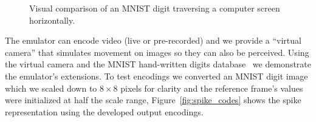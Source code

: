 \documentclass[conference]{IEEEtran}
\begin{document}
\begin{figure}[htb]
  \caption{Visual comparison of an MNIST digit traversing a computer screen horizontally.}
  \label{fig:dvs_vs_cam}
  
\end{figure}

The emulator can encode video (live or pre-recorded) and we provide a ``virtual camera'' that simulates movement on images so they can also be perceived. Using the virtual camera and the MNIST hand-written digits database~\cite{mnist,mnist:web} we demonstrate the emulator's extensions. To test encodings we converted an MNIST  digit image which we scaled down to $8\times8$ pixels for clarity and the reference frame's values were initialized at half the scale range, Figure~\ref{fig:spike_codes} shows the spike representation using the developed output encodings.

\setcounter{figure}{12} %
\end{document}
